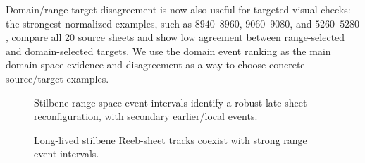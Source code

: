 Domain/range target disagreement is now also useful for targeted visual checks:
the strongest normalized examples, such as \(8940\)--\(8960\),
\(9060\)--\(9080\), and \(5260\)--\(5280\), compare all 20 source sheets and
show low agreement between range-selected and domain-selected targets. We use
the domain event ranking as the main domain-space evidence and disagreement as
a way to choose concrete source/target examples.

\begin{figure}[t]
  \centering
  \caption{Stilbene range-space event intervals identify a robust late sheet
  reconfiguration, with secondary earlier/local events.}
  \label{fig:stilbene-range-events}
\end{figure}

\begin{figure}[t]
  \centering
  \caption{Long-lived stilbene Reeb-sheet tracks coexist with strong range
  event intervals.}
  \label{fig:stilbene-long-lived-tracks}
\end{figure}
